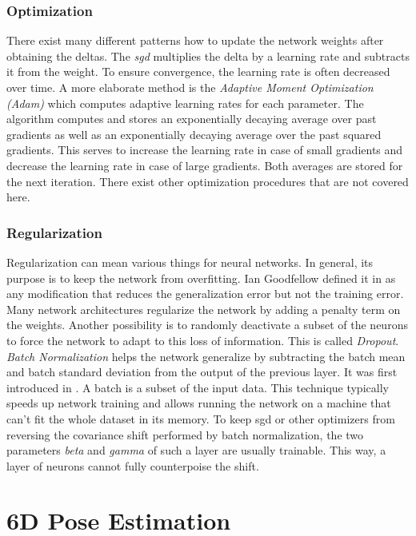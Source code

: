 \subsubsection{Optimization} There exist many different patterns how to update the network weights after obtaining the deltas. The \textit{\ac{sgd}} multiplies the delta by a learning rate and subtracts it from the weight. To ensure convergence, the learning rate is often decreased over time. A more elaborate method is the \textit{Adaptive Moment Optimization (Adam)} \cite{adam} which computes adaptive learning rates for each parameter. The algorithm computes and stores an exponentially decaying average over past gradients as well as an exponentially decaying average over the past squared gradients. This serves to increase the learning rate in case of small gradients and decrease the learning rate in case of large gradients. Both averages are stored for the next iteration. There exist other optimization procedures that are not covered here.
	
\subsubsection{Regularization} Regularization can mean various things for neural networks. In general, its purpose is to keep the network from overfitting. Ian Goodfellow defined it in \cite{goodfellow} as any modification that reduces the generalization error but not the training error. Many network architectures regularize the network by adding a penalty term on the weights. Another possibility is to randomly deactivate a subset of the neurons to force the network to adapt to this loss of information. This is called \textit{Dropout}. \textit{Batch Normalization} helps the network generalize by subtracting the batch mean and batch standard deviation from the output of the previous layer. It was first introduced in \cite{batch_normalization}. A batch is a subset of the input data. This technique typically speeds up network training and allows running the network on a machine that can't fit the whole dataset in its memory. To keep \ac{sgd} or other optimizers from reversing the covariance shift performed by batch normalization, the two parameters \textit{beta} and \textit{gamma} of such a layer are usually trainable. This way, a layer of neurons cannot fully counterpoise the shift. 

\section{6D Pose Estimation}

